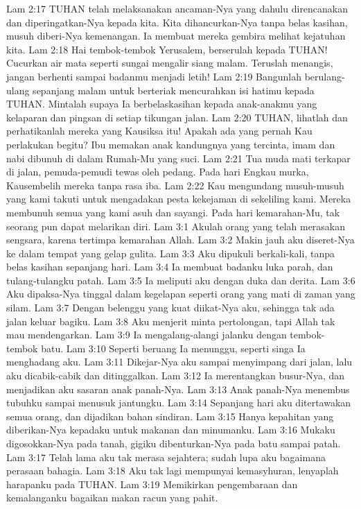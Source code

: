 Lam 2:17  TUHAN telah melaksanakan ancaman-Nya yang dahulu direncanakan dan diperingatkan-Nya kepada kita. Kita dihancurkan-Nya tanpa belas kasihan, musuh diberi-Nya kemenangan. Ia membuat mereka gembira melihat kejatuhan kita.
Lam 2:18  Hai tembok-tembok Yerusalem, berserulah kepada TUHAN! Cucurkan air mata seperti sungai mengalir siang malam. Teruslah menangis, jangan berhenti sampai badanmu menjadi letih!
Lam 2:19  Bangunlah berulang-ulang sepanjang malam untuk berteriak mencurahkan isi hatimu kepada TUHAN. Mintalah supaya Ia berbelaskasihan kepada anak-anakmu yang kelaparan dan pingsan di setiap tikungan jalan.
Lam 2:20  TUHAN, lihatlah dan perhatikanlah mereka yang Kausiksa itu! Apakah ada yang pernah Kau perlakukan begitu? Ibu memakan anak kandungnya yang tercinta, imam dan nabi dibunuh di dalam Rumah-Mu yang suci.
Lam 2:21  Tua muda mati terkapar di jalan, pemuda-pemudi tewas oleh pedang. Pada hari Engkau murka, Kausembelih mereka tanpa rasa iba.
Lam 2:22  Kau mengundang musuh-musuh yang kami takuti untuk mengadakan pesta kekejaman di sekeliling kami. Mereka membunuh semua yang kami asuh dan sayangi. Pada hari kemarahan-Mu, tak seorang pun dapat melarikan diri.
Lam 3:1  Akulah orang yang telah merasakan sengsara, karena tertimpa kemarahan Allah.
Lam 3:2  Makin jauh aku diseret-Nya ke dalam tempat yang gelap gulita.
Lam 3:3  Aku dipukuli berkali-kali, tanpa belas kasihan sepanjang hari.
Lam 3:4  Ia membuat badanku luka parah, dan tulang-tulangku patah.
Lam 3:5  Ia meliputi aku dengan duka dan derita.
Lam 3:6  Aku dipaksa-Nya tinggal dalam kegelapan seperti orang yang mati di zaman yang silam.
Lam 3:7  Dengan belenggu yang kuat diikat-Nya aku, sehingga tak ada jalan keluar bagiku.
Lam 3:8  Aku menjerit minta pertolongan, tapi Allah tak mau mendengarkan.
Lam 3:9  Ia mengalang-alangi jalanku dengan tembok-tembok batu.
Lam 3:10  Seperti beruang Ia menunggu, seperti singa Ia menghadang aku.
Lam 3:11  Dikejar-Nya aku sampai menyimpang dari jalan, lalu aku dicabik-cabik dan ditinggalkan.
Lam 3:12  Ia merentangkan busur-Nya, dan menjadikan aku sasaran anak panah-Nya.
Lam 3:13  Anak panah-Nya menembus tubuhku sampai menusuk jantungku.
Lam 3:14  Sepanjang hari aku ditertawakan semua orang, dan dijadikan bahan sindiran.
Lam 3:15  Hanya kepahitan yang diberikan-Nya kepadaku untuk makanan dan minumanku.
Lam 3:16  Mukaku digosokkan-Nya pada tanah, gigiku dibenturkan-Nya pada batu sampai patah.
Lam 3:17  Telah lama aku tak merasa sejahtera; sudah lupa aku bagaimana perasaan bahagia.
Lam 3:18  Aku tak lagi mempunyai kemasyhuran, lenyaplah harapanku pada TUHAN.
Lam 3:19  Memikirkan pengembaraan dan kemalanganku bagaikan makan racun yang pahit.
